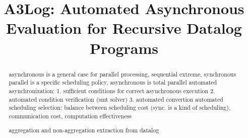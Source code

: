 \documentclass{vldb}
\begin{document}
%
\title{A3Log: Automated Asynchronous Evaluation for Recursive Datalog Programs}



%
\author{}

\maketitle


\begin{abstract}


asynchronous is a general case for parallel processing, sequential extreme, synchronous parallel is a specific scheduling policy, asynchronous is total parallel
automated asynchronization: 1. sufficient conditions for correct asynchronous execution 2. automated condition verification (smt solver) 3. automated convertion
automated scheduling selection: balance between scheduling cost (sync. is a kind of scheduling), communication cost, computation effectiveness

aggregation and non-aggregation extraction from datalog 

\end{abstract}
\end{document}
